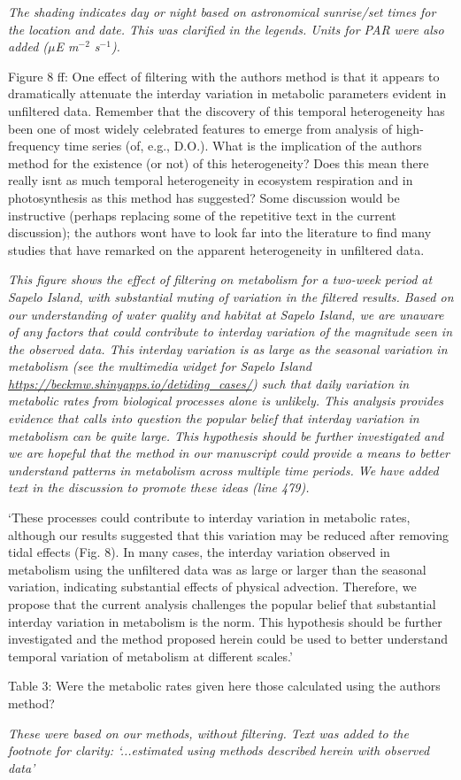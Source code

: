 \documentclass[letterpaper,12pt]{article}\usepackage[]{graphicx}\usepackage[]{color}
\begin{document}
{\it The shading indicates day or night based on astronomical sunrise/set times for the location and date.  This was clarified in the legends.  Units for PAR were also added ($\mu$E m$^{-2}$ s$^{-1}$).}
 
Figure 8 ff: One effect of filtering with the authors method is that it appears to dramatically attenuate the interday variation in metabolic parameters evident in unfiltered data. Remember that the discovery of this temporal heterogeneity has been one of most widely celebrated features to emerge from analysis of high-frequency time series (of, e.g., D.O.). What is the implication of the authors method for the existence (or not) of this heterogeneity? Does this mean there really isnt as much temporal heterogeneity in ecosystem respiration and in photosynthesis as this method has suggested? Some discussion would be instructive (perhaps
replacing some of the repetitive text in the current discussion); the authors wont have to look far into the literature to find many studies that have remarked on the apparent heterogeneity in unfiltered data.

{\it This figure shows the effect of filtering on metabolism for a two-week period at Sapelo Island, with substantial muting of variation in the filtered results.  Based on our understanding of water quality and habitat at Sapelo Island, we are unaware of any factors that could contribute to interday variation of the magnitude seen in the observed data.  This interday variation is as large as the seasonal variation in metabolism (see the multimedia widget for Sapelo Island  \href{https://beckmw.shinyapps.io/detiding_cases/}{https://beckmw.shinyapps.io/detiding\_cases/}) such that daily variation in metabolic rates from biological processes alone is unlikely.  This analysis provides evidence that calls into question the popular belief that interday variation in metabolism can be quite large.  This hypothesis should be further investigated and we are hopeful that the method in our manuscript could provide a means to better understand patterns in metabolism across multiple time periods.  We have added text in the discussion to promote these ideas (line 479).    

`These processes could contribute to interday variation in metabolic rates, although our results suggested that this variation may be reduced after removing tidal effects (Fig. 8).  In many cases, the interday variation observed in metabolism using the unfiltered data was as large or larger than the seasonal variation, indicating substantial effects of physical advection.  Therefore, we propose that the current analysis challenges the popular belief that substantial interday variation in metabolism is the norm.  This hypothesis should be further investigated and the method proposed herein could be used to better understand temporal variation of metabolism at different scales.'}

Table 3: Were the metabolic rates given here those calculated using the authors method?

{\it These were based on our methods, without filtering.  Text was added to the footnote for clarity: `...estimated using methods described herein with observed data'}
\end{document}
